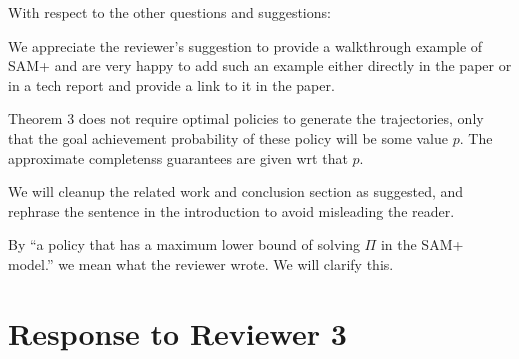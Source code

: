 \documentclass[letterpaper]{article} %
\begin{document}
\begin{compactenum}
\end{compactenum}

\noindent With respect to the other questions and suggestions:
\begin{compactenum}
    \item We appreciate the reviewer's suggestion to provide a walkthrough example of SAM+ and are very happy to add such an example either directly in the paper or in a tech report and provide a link to it in the paper. 

    \item Theorem 3 does not require optimal policies to generate the trajectories, only that the goal achievement probability of these policy will be some value $p$. The approximate completenss guarantees are given wrt that $p$. 
    
    \item We will cleanup the related work and conclusion section as suggested, and rephrase the sentence in the introduction to avoid misleading the reader. 
    
    \item By “a policy that has a maximum lower bound of solving $\Pi$ in the SAM+ model.” we mean what the reviewer wrote. We will clarify this.  
\end{compactenum}


\section{Response to Reviewer 3}
\end{document}
